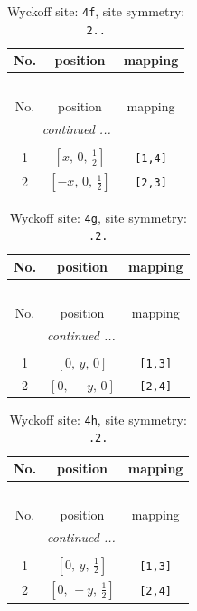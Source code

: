 \documentclass[fleqn,8pt]{jsarticle}
\begin{document}
\renewcommand{\arraystretch}{1.2}
\begin{longtable}{ccc}
\caption{Wyckoff site: {\tt 4f}, site symmetry: {\tt 2..}}
 \\
 \hline \hline
No. & position & mapping \\ \hline \endfirsthead

\multicolumn{2}{l}{\tablename\ \thetable{}} \\
 \hline \hline
No. & position & mapping \\ \hline \endhead

 \hline \hline
\multicolumn{2}{r}{\footnotesize\it continued ...} \\ \endfoot

 \hline \hline
\multicolumn{2}{r}{} \\ \endlastfoot

1 & $\left[ x,\, 0,\, \frac{1}{2} \right]$ & {\tt [1,4]} \\ \hline
2 & $\left[ - x,\, 0,\, \frac{1}{2} \right]$ & {\tt [2,3]} \\
\end{longtable}
\renewcommand{\arraystretch}{1.2}
\begin{longtable}{ccc}
\caption{Wyckoff site: {\tt 4g}, site symmetry: {\tt .2.}}
 \\
 \hline \hline
No. & position & mapping \\ \hline \endfirsthead

\multicolumn{2}{l}{\tablename\ \thetable{}} \\
 \hline \hline
No. & position & mapping \\ \hline \endhead

 \hline \hline
\multicolumn{2}{r}{\footnotesize\it continued ...} \\ \endfoot

 \hline \hline
\multicolumn{2}{r}{} \\ \endlastfoot

1 & $\left[ 0,\, y,\, 0 \right]$ & {\tt [1,3]} \\ \hline
2 & $\left[ 0,\, - y,\, 0 \right]$ & {\tt [2,4]} \\
\end{longtable}
\renewcommand{\arraystretch}{1.2}
\begin{longtable}{ccc}
\caption{Wyckoff site: {\tt 4h}, site symmetry: {\tt .2.}}
 \\
 \hline \hline
No. & position & mapping \\ \hline \endfirsthead

\multicolumn{2}{l}{\tablename\ \thetable{}} \\
 \hline \hline
No. & position & mapping \\ \hline \endhead

 \hline \hline
\multicolumn{2}{r}{\footnotesize\it continued ...} \\ \endfoot

 \hline \hline
\multicolumn{2}{r}{} \\ \endlastfoot

1 & $\left[ 0,\, y,\, \frac{1}{2} \right]$ & {\tt [1,3]} \\ \hline
2 & $\left[ 0,\, - y,\, \frac{1}{2} \right]$ & {\tt [2,4]} \\
\end{longtable}
\end{document}
